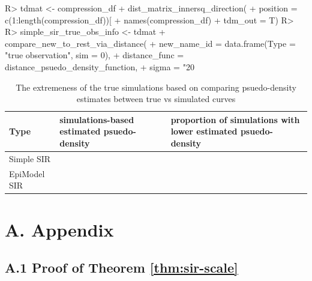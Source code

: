 \documentclass[
  shortnames]{jss}
\begin{document}
\begin{CodeChunk}
\begin{CodeInput}
R> tdmat <- compression_df %
+   dist_matrix_innersq_direction(
+     position = c(1:length(compression_df))[
+       names(compression_df) %
+     tdm_out = T)
R> 
R> simple_sir_true_obs_info <- tdmat %
+   compare_new_to_rest_via_distance(
+     new_name_id = data.frame(Type = "true observation", sim = 0),
+     distance_func = distance_psuedo_density_function, 
+     sigma = "20%
\end{CodeInput}
\end{CodeChunk}

\begin{CodeChunk}
\begin{table}[!h]

\caption{\label{tab:hags-extreme}The extremeness of the true simulations based on comparing psuedo-density estimates between true vs simulated curves}
\centering
\begin{tabular}[t]{l>{\raggedleft\arraybackslash}p{6cm}>{\raggedleft\arraybackslash}p{6cm}}
\toprule
Type & simulations-based estimated psuedo-density & proportion of simulations with lower estimated psuedo-density\\
\midrule
Simple SIR & 0.0036733 & 0.00\\
EpiModel SIR & 0.0149686 & 0.02\\
\bottomrule
\end{tabular}
\end{table}

\end{CodeChunk}

\hypertarget{a.-appendix}{%
\section*{A. Appendix}\label{a.-appendix}}

\hypertarget{a.1-proof-of-theorem}{%
\subsection*{\texorpdfstring{A.1 Proof of Theorem
\ref{thm:sir-scale}}{A.1 Proof of Theorem }}\label{a.1-proof-of-theorem}}
\end{document}
